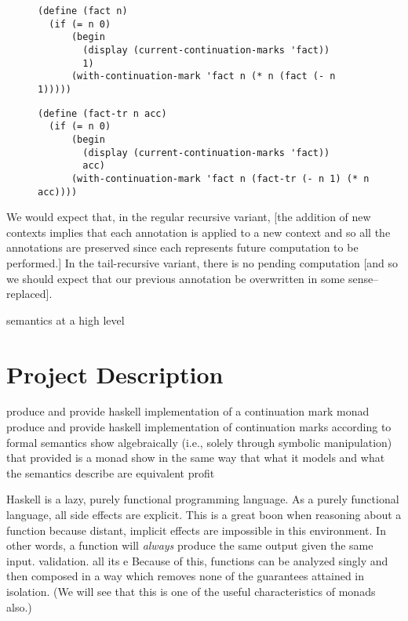 \documentclass[ms]{byuprop}
\begin{document}

\begin{figure}
\label{fac-rec-cm}
\begin{verbatim}
(define (fact n)
  (if (= n 0)
      (begin
        (display (current-continuation-marks 'fact))
        1)
      (with-continuation-mark 'fact n (* n (fact (- n 1)))))
\end{verbatim}
\end{figure}

\begin{figure}
\label{fac-tail-rec-cm}
\begin{verbatim}
(define (fact-tr n acc)
  (if (= n 0)
      (begin
        (display (current-continuation-marks 'fact))
        acc)
      (with-continuation-mark 'fact n (fact-tr (- n 1) (* n acc))))
\end{verbatim}
\end{figure}

We would expect that, in the regular recursive variant, [the addition of new contexts
implies that each annotation is applied to a new context and so all the annotations are
preserved since each represents future computation to be performed.] In the tail-recursive
variant, there is no pending computation [and so we should expect that our previous
annotation be overwritten in some sense--replaced].


semantics at a high level

\section{Project Description}

produce and provide haskell implementation of a continuation mark monad produce and
provide haskell implementation of continuation marks according to formal semantics show
algebraically (i.e., solely through symbolic manipulation) that provided is a monad show
in the same way that what it models and what the semantics describe are equivalent profit

Haskell \cite{hudak1992report} is a lazy, purely functional programming language. As a
purely functional language, all side effects are explicit. This is a great boon when
reasoning about a function because distant, implicit effects are impossible in this
environment. In other words, a function will \emph{always} produce the same output given
the same input. %
validation. all its e Because of this, functions can be analyzed singly and then composed
in a way which removes none of the guarantees attained in isolation. (We will see that
this is one of the useful characteristics of monads also.)
\end{document}
